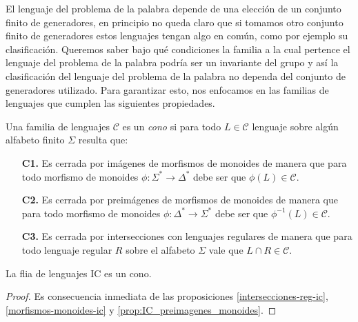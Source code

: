 \documentclass[tesis.tex]{subfiles}
\begin{document}
El lenguaje del problema de la palabra depende de una elección de un conjunto finito de generadores, en principio no queda claro que si tomamos otro conjunto finito de generadores estos lenguajes tengan algo en común, como por ejemplo su clasificación.
Queremos saber bajo qué condiciones la familia a la cual pertence el lenguaje del problema de la palabra podría ser un invariante del grupo y así la clasificación del lenguaje del problema de la palabra no dependa del conjunto de generadores utilizado.
Para garantizar esto, nos enfocamos en las familias de lenguajes que cumplen las siguientes propiedades.
\medskip
\begin{deff}
	Una familia de lenguajes $\mathcal{C}$ es un \emph{cono} si para todo $L \in \mathcal{C}$ lenguaje sobre algún alfabeto finito $\Sigma$ resulta que:
	\begin{itemize}
		\item[\textbf{C1.}] Es cerrada por imágenes de morfismos de monoides de manera que para todo morfismo de monoides $\phi:\Sigma^* \to \Delta^*$ debe ser que $\phi(L) \in \mathcal{C}$.
		\item[\textbf{C2.}] Es cerrada por preimágenes de morfismos de monoides de manera que para todo morfismo de monoides  $\phi:\Delta^* \to \Sigma^*$ debe ser que $\phi^{-1}(L) \in \mathcal{C}$. 
		\item[\textbf{C3.}] Es cerrada por intersecciones con lenguajes regulares de manera que para todo lenguaje regular $R$ sobre el alfabeto $\Sigma$ vale que $L \cap R \in \mathcal{C}$.
	\end{itemize}
\end{deff} 

\begin{lema}
	La flia de lenguajes $\text{IC}$ es un cono.
\end{lema}
\begin{proof}
	Es consecuencia inmediata de las proposiciones							\ref{intersecciones-reg-ic}, \ref{morfismos-monoides-ic} y \ref{prop:IC_preimagenes_monoides}.
\end{proof}
\end{document}
